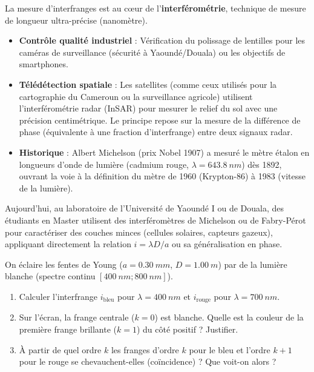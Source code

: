 \documentclass[11pt]{article}
\begin{document}
\begin{savaistu}
La mesure d'interfranges est au cœur de l'\textbf{interférométrie}, technique de mesure de longueur ultra-précise (nanomètre).
\begin{itemize}
\item \textbf{Contrôle qualité industriel} : Vérification du polissage de lentilles pour les caméras de surveillance (sécurité à Yaoundé/Douala) ou les objectifs de smartphones.
\item \textbf{Télédétection spatiale} : Les satellites (comme ceux utilisés pour la cartographie du Cameroun ou la surveillance agricole) utilisent l'interférométrie radar (InSAR) pour mesurer le relief du sol avec une précision centimétrique. Le principe repose sur la mesure de la différence de phase (équivalente à une fraction d'interfrange) entre deux signaux radar.
\item \textbf{Historique} : Albert Michelson (prix Nobel 1907) a mesuré le mètre étalon en longueurs d'onde de lumière (cadmium rouge, $\lambda = \SI{643,8}{nm}$) dès 1892, ouvrant la voie à la définition du mètre de 1960 (Krypton-86) à 1983 (vitesse de la lumière).
\end{itemize}
Aujourd'hui, au laboratoire de l'Université de Yaoundé I ou de Douala, des étudiants en Master utilisent des interféromètres de Michelson ou de Fabry-Pérot pour caractériser des couches minces (cellules solaires, capteurs gazeux), appliquant directement la relation $i = \lambda D/a$ ou sa généralisation en phase.
\end{savaistu}

\begin{exercice}
On éclaire les fentes de Young ($a = \SI{0,30}{mm}$, $D = \SI{1,00}{m}$) par de la lumière blanche (spectre continu $[\SI{400}{nm}; \SI{800}{nm}]$).
\begin{enumerate}
\item Calculer l'interfrange $i_{\text{bleu}}$ pour $\lambda = \SI{400}{nm}$ et $i_{\text{rouge}}$ pour $\lambda = \SI{700}{nm}$.
\item Sur l'écran, la frange centrale ($k=0$) est blanche. Quelle est la couleur de la première frange brillante ($k=1$) du côté positif ? Justifier.
\item À partir de quel ordre $k$ les franges d'ordre $k$ pour le bleu et l'ordre $k+1$ pour le rouge se chevauchent-elles (coïncidence) ? Que voit-on alors ?
\end{enumerate}
\end{exercice}
\end{document}
